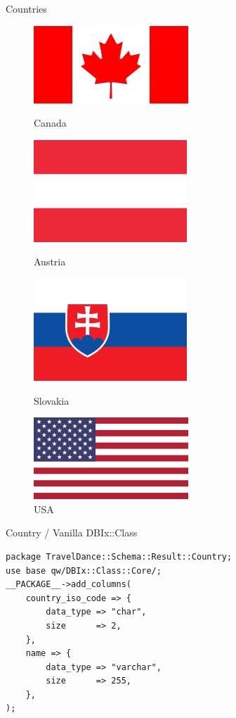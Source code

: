 \begin{frame}{Countries}
\begin{figure}
\centering

\begin{minipage}{.24\textwidth}
\centering
\includegraphics[width=0.24\linewidth]{img/countries/canada.png}
\caption{Canada}
\end{minipage}
\begin{minipage}{.24\textwidth}
\centering
\includegraphics[width=0.24\linewidth]{img/countries/austria.png}
\caption{Austria}
\end{minipage}
\begin{minipage}{.24\textwidth}
\centering
\includegraphics[width=0.24\linewidth]{img/countries/slovakia.png}
\caption{Slovakia}
\end{minipage}
\begin{minipage}{.24\textwidth}
\centering
\includegraphics[width=0.24\linewidth]{img/countries/usa.png}
\caption{USA}
\end{minipage}

\end{figure}

\end{frame}

\begin{frame}[fragile]{Country / Vanilla DBIx::Class}
\begin{lstlisting}
package TravelDance::Schema::Result::Country;
use base qw/DBIx::Class::Core/;
__PACKAGE__->add_columns(
    country_iso_code => {
        data_type => "char",
        size      => 2,
    },
    name => {
        data_type => "varchar",
        size      => 255,
    },
);
\end{lstlisting}
\end{frame}

